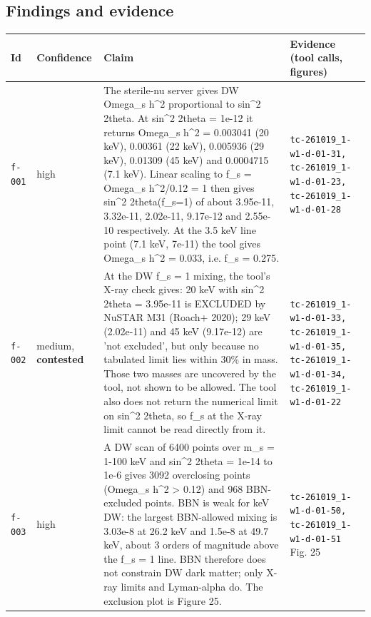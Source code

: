 \documentclass[11pt,a4paper]{article}
\begin{document}
\subsection{Findings and evidence}
\begin{longtable}{@{}p{}p{}p{}p{}@{}}
\toprule Id & Confidence & Claim & Evidence (tool calls, figures) \\ \midrule \endhead
\texttt{f-001} & high & The sterile-nu server gives DW Omega\_s h\textasciicircum{}2 proportional to sin\textasciicircum{}2 2theta. At sin\textasciicircum{}2 2theta = 1e-12 it returns Omega\_s h\textasciicircum{}2 = 0.003041 (20 keV), 0.00361 (22 keV), 0.005936 (29 keV), 0.01309 (45 keV) and 0.0004715 (7.1 keV). Linear scaling to f\_s = Omega\_s h\textasciicircum{}2/0.12 = 1 then gives sin\textasciicircum{}2 2theta(f\_s=1) of about 3.95e-11, 3.32e-11, 2.02e-11, 9.17e-12 and 2.55e-10 respectively. At the 3.5 keV line point (7.1 keV, 7e-11) the tool gives Omega\_s h\textasciicircum{}2 = 0.033, i.e. f\_s = 0.275. & \texttt{tc-261019\_\allowbreak{}1-w1-d-01-31,\allowbreak{} tc-261019\_\allowbreak{}1-w1-d-01-23,\allowbreak{} tc-261019\_\allowbreak{}1-w1-d-01-28} \\
\texttt{f-002} & medium, \textbf{contested} & At the DW f\_s = 1 mixing, the tool's X-ray check gives: 20 keV with sin\textasciicircum{}2 2theta = 3.95e-11 is EXCLUDED by NuSTAR M31 (Roach+ 2020); 29 keV (2.02e-11) and 45 keV (9.17e-12) are 'not excluded', but only because no tabulated limit lies within 30\% in mass. Those two masses are uncovered by the tool, not shown to be allowed. The tool also does not return the numerical limit on sin\textasciicircum{}2 2theta, so f\_s at the X-ray limit cannot be read directly from it. & \texttt{tc-261019\_\allowbreak{}1-w1-d-01-33,\allowbreak{} tc-261019\_\allowbreak{}1-w1-d-01-35,\allowbreak{} tc-261019\_\allowbreak{}1-w1-d-01-34,\allowbreak{} tc-261019\_\allowbreak{}1-w1-d-01-22} \\
\texttt{f-003} & high & A DW scan of 6400 points over m\_s = 1-100 keV and sin\textasciicircum{}2 2theta = 1e-14 to 1e-6 gives 3092 overclosing points (Omega\_s h\textasciicircum{}2 \textgreater{} 0.12) and 968 BBN-excluded points. BBN is weak for keV DW: the largest BBN-allowed mixing is 3.03e-8 at 26.2 keV and 1.5e-8 at 49.7 keV, about 3 orders of magnitude above the f\_s = 1 line. BBN therefore does not constrain DW dark matter; only X-ray limits and Lyman-alpha do. The exclusion plot is Figure 25. & \texttt{tc-261019\_\allowbreak{}1-w1-d-01-50,\allowbreak{} tc-261019\_\allowbreak{}1-w1-d-01-51} Fig. 25 \\

\end{longtable}
\end{document}
